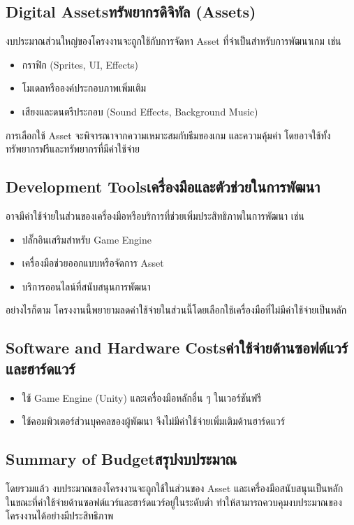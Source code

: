 \subsection{\ifenglish Digital Assets\else ทรัพยากรดิจิทัล (Assets)\fi}
    \hspace{1.5em}งบประมาณส่วนใหญ่ของโครงงานจะถูกใช้กับการจัดหา Asset ที่จำเป็นสำหรับการพัฒนาเกม เช่น
    \begin{itemize}
        \item กราฟิก (Sprites, UI, Effects)
        \item โมเดลหรือองค์ประกอบภาพเพิ่มเติม
        \item เสียงและดนตรีประกอบ (Sound Effects, Background Music)
    \end{itemize}
    \hspace{1.5em}การเลือกใช้ Asset จะพิจารณาจากความเหมาะสมกับธีมของเกม และความคุ้มค่า โดยอาจใช้ทั้ง\\ทรัพยากรฟรีและทรัพยากรที่มีค่าใช้จ่าย

\subsection{\ifenglish Development Tools\else เครื่องมือและตัวช่วยในการพัฒนา\fi}
    \hspace{1.5em}อาจมีค่าใช้จ่ายในส่วนของเครื่องมือหรือบริการที่ช่วยเพิ่มประสิทธิภาพในการพัฒนา เช่น
    \begin{itemize}
        \item ปลั๊กอินเสริมสำหรับ Game Engine
        \item เครื่องมือช่วยออกแบบหรือจัดการ Asset
        \item บริการออนไลน์ที่สนับสนุนการพัฒนา
    \end{itemize}
    \hspace{1.5em}อย่างไรก็ตาม โครงงานนี้พยายามลดค่าใช้จ่ายในส่วนนี้โดยเลือกใช้เครื่องมือที่ไม่มีค่าใช้จ่ายเป็นหลัก

\subsection{\ifenglish Software and Hardware Costs\else ค่าใช้จ่ายด้านซอฟต์แวร์และฮาร์ดแวร์\fi}
    \begin{itemize}
        \item ใช้ Game Engine (Unity) และเครื่องมือหลักอื่น ๆ ในเวอร์ชันฟรี
        \item ใช้คอมพิวเตอร์ส่วนบุคคลของผู้พัฒนา จึงไม่มีค่าใช้จ่ายเพิ่มเติมด้านฮาร์ดแวร์
    \end{itemize}

\subsection{\ifenglish Summary of Budget\else สรุปงบประมาณ\fi}
    \hspace{1.5em}โดยรวมแล้ว งบประมาณของโครงงานจะถูกใช้ในส่วนของ Asset และเครื่องมือสนับสนุนเป็นหลัก \\ในขณะที่ค่าใช้จ่ายด้านซอฟต์แวร์และฮาร์ดแวร์อยู่ในระดับต่ำ ทำให้สามารถควบคุมงบประมาณของโครงงานได้อย่างมีประสิทธิภาพ